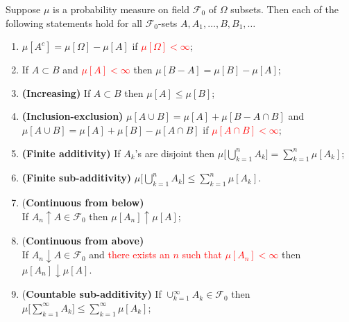 \begin{theorem}
Suppose $\mu$ is a probability measure on field $\mathcal F_0$ of $\Omega$ subsets. Then each of the following statements hold for all $\mathcal F_0$-sets $A, A_1, \ldots, B, B_1, \ldots$
\begin{enumerate}
\item $\mu[A^c] = \mu[\Omega]-\mu[A]$ if \textcolor{red}{$\mu[\Omega]<\infty$};
\item\label{bpfa one} If $A\subset B$ and \textcolor{red}{$\mu[A]<\infty$} then $\mu[B-A]=\mu[B]-\mu[A]$;
\item\label{bpfa two} {\bf (Increasing)} If $A\subset B$ then  $\mu[A]\leq \mu[B]$;
\item\label{bpfa three} {\bf (Inclusion-exclusion)} $\mu[A\cup B] = \mu[A]+ \mu[B - A\cap B]$ and $\mu[A\cup B] = \mu[A]+ \mu[B] - \mu[A\cap B]$ if \textcolor{red}{$\mu[A\cap B]<\infty$};
\item\label{bpfa four} {\bf (Finite additivity)}  If $A_k$'s are disjoint then
$\mu\bigl[ \bigcup_{k=1}^n A_k \bigr] = \sum_{k=1}^n \mu[A_k]$;
\item\label{bpfa five} {\bf (Finite sub-additivity)}
$\mu\bigl[ \bigcup_{k=1}^n A_k \bigr] \leq \sum_{k=1}^n \mu[A_k]$.
\item{(\bf Continuous from below)} \\ If  $A_n\uparrow A\in \mathcal F_0$ then $\mu[A_n]\uparrow \mu[A]$;
\item{(\bf Continuous from above)} \\ If $A_n\downarrow A\in \mathcal F_0$ and \textcolor{red}{there exists an $n$ such that $\mu[A_n]<\infty$} then $\mu[A_n]\downarrow \mu[A]$.
\item{(\bf Countable sub-additivity)} If $\cup_{k=1}^\infty A_k \in \mathcal F_0$  then $\mu\bigl[\sum_{k=1}^\infty A_k\bigr] \leq \sum_{k=1}^\infty \mu[A_k]$;
\end{enumerate}
\end{theorem}




%
%
%



